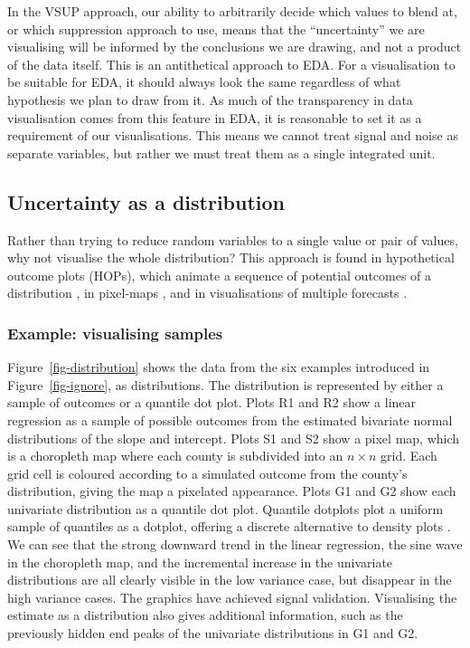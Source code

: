 \documentclass[]{ar-1col-S2O}
\begin{document}
In the VSUP approach, our ability to arbitrarily decide which values to
blend at, or which suppression approach to use, means that the
``uncertainty'' we are visualising will be informed by the conclusions
we are drawing, and not a product of the data itself. This is an
antithetical approach to EDA. For a visualisation to be suitable for
EDA, it should always look the same regardless of what hypothesis we
plan to draw from it. As much of the transparency in data visualisation
comes from this feature in EDA, it is reasonable to set it as a
requirement of our visualisations. This means we cannot treat signal and
noise as separate variables, but rather we must treat them as a single
integrated unit.

\subsection{Uncertainty as a
distribution}\label{uncertainty-as-a-distribution}

Rather than trying to reduce random variables to a single value or pair
of values, why not visualise the whole distribution? This approach is
found in hypothetical outcome plots (HOPs), which animate a sequence of
potential outcomes of a distribution \citep{Hullman2015}, in pixel-maps
\citep{Lucchesi2021, Blenkinsop2000}, and in visualisations of multiple
forecasts \citep{fpp3}.

\subsubsection{Example: visualising
samples}\label{example-visualising-samples}

Figure~\ref{fig-distribution} shows the data from the six examples
introduced in Figure~\ref{fig-ignore}, as distributions. The
distribution is represented by either a sample of outcomes or a quantile
dot plot. Plots R1 and R2 show a linear regression as a sample of
possible outcomes from the estimated bivariate normal distributions of
the slope and intercept. Plots S1 and S2 show a pixel map, which is a
choropleth map where each county is subdivided into an \(n\times n\)
grid. Each grid cell is coloured according to a simulated outcome from
the county's distribution, giving the map a pixelated appearance. Plots
G1 and G2 show each univariate distribution as a quantile dot plot.
Quantile dotplots plot a uniform sample of quantiles as a dotplot,
offering a discrete alternative to density plots \citep{Kay2023}. We can
see that the strong downward trend in the linear regression, the sine
wave in the choropleth map, and the incremental increase in the
univariate distributions are all clearly visible in the low variance
case, but disappear in the high variance cases. The graphics have
achieved signal validation. Visualising the estimate as a distribution
also gives additional information, such as the previously hidden end
peaks of the univariate distributions in G1 and G2.
\end{document}
